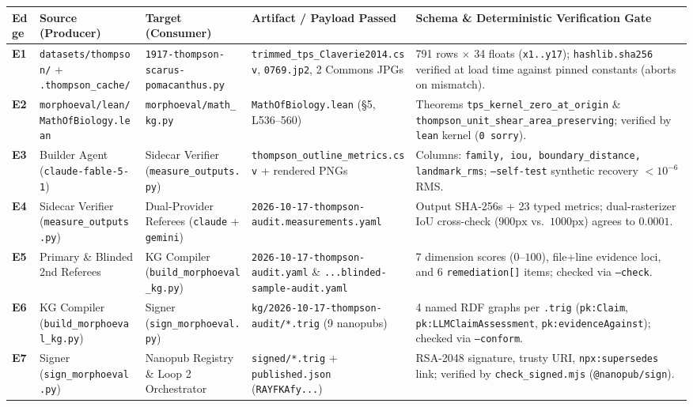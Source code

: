 \documentclass[10.5pt,a4paper]{article}
\newcommand{\code}[1]{{\footnotesize\nolinkurl{#1}}}
\begin{document}
\vspace{0.3em}
{\footnotesize
\renewcommand{\arraystretch}{1.22}
\begin{tabularx}{\textwidth}{L{0.28in} L{1.22in} L{1.22in} L{1.38in} Y}
\toprule
\textbf{Edge} & \textbf{Source (Producer)} & \textbf{Target (Consumer)} & \textbf{Artifact / Payload Passed} & \textbf{Schema \& Deterministic Verification Gate} \\
\midrule
\textbf{E1} & \code{datasets/thompson/} + \code{.thompson_cache/} & \code{1917-thompson-scarus-pomacanthus.py} & \code{trimmed_tps_Claverie2014.csv}, \code{0769.jp2}, 2 Commons JPGs & 791 rows $\times$ 34 floats (\texttt{x1..y17}); \texttt{hashlib.sha256} verified at load time against pinned constants (aborts on mismatch). \\
\textbf{E2} & \code{morphoeval/lean/MathOfBiology.lean} & \code{morphoeval/math_kg.py} & \code{MathOfBiology.lean} (\S5, L536--560) & Theorems \code{tps_kernel_zero_at_origin} \& \code{thompson_unit_shear_area_preserving}; verified by \texttt{lean} kernel (\texttt{0 sorry}). \\
\textbf{E3} & Builder Agent (\code{claude-fable-5-1}) & Sidecar Verifier (\code{measure_outputs.py}) & \code{thompson_outline_metrics.csv} + rendered PNGs & Columns: \texttt{family, iou, boundary\_distance, landmark\_rms}; \texttt{--self-test} synthetic recovery $< 10^{-6}$ RMS. \\
\textbf{E4} & Sidecar Verifier (\code{measure_outputs.py}) & Dual-Provider Referees (\code{claude} + \code{gemini}) & \code{2026-10-17-thompson-audit.measurements.yaml} & Output SHA-256s + 23 typed metrics; dual-rasterizer $\mathrm{IoU}$ cross-check ($900\text{px}$ vs.\ $1000\text{px}$) agrees to $0.0001$. \\
\textbf{E5} & Primary \& Blinded 2nd Referees & KG Compiler (\code{build_morphoeval_kg.py}) & \code{2026-10-17-thompson-audit.yaml} \& \code{...blinded-sample-audit.yaml} & 7 dimension scores ($0\text{--}100$), file+line evidence loci, and 6 \texttt{remediation[]} items; checked via \texttt{--check}. \\
\textbf{E6} & KG Compiler (\code{build_morphoeval_kg.py}) & Signer (\code{sign_morphoeval.py}) & \code{kg/2026-10-17-thompson-audit/*.trig} (9 nanopubs) & 4 named RDF graphs per \texttt{.trig} (\texttt{pk:Claim}, \texttt{pk:LLMClaimAssessment}, \texttt{pk:evidenceAgainst}); checked via \texttt{--conform}. \\
\textbf{E7} & Signer (\code{sign_morphoeval.py}) & Nanopub Registry \& Loop 2 Orchestrator & \code{signed/*.trig} + \code{published.json} (\code{RAYFKAfy...}) & RSA-2048 signature, trusty URI, \texttt{npx:supersedes} link; verified by \code{check_signed.mjs} (\texttt{@nanopub/sign}). \\

\end{tabularx}}
\end{document}
